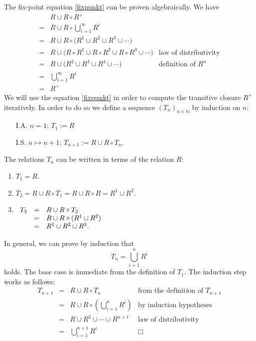 The fix-point equation  \ref{fixpunkt} can be proven algebraically.  We have
\[
\begin{array}{cll}
    & R \cup R \circ R^+ \\[0.2cm]
  = & R \cup R \circ \bigcup\limits_{i=1}^{\infty} R^i \\[0.4cm]
  = & R \cup R \circ \bigl(R^1 \cup R^2 \cup R^3 \cup \cdots \bigr) \\[0.2cm]
  = & R \cup \bigl(R \circ R^1 \cup R \circ R^2 \cup R \circ R^3 \cup \cdots \bigr) &
      \mbox{law of distributivity} \\[0.2cm]
  = & R \cup \bigl(R^2 \cup R^3 \cup  R^4 \cup \cdots \bigr) & \mbox{definition of $R^n$} \\[0.2cm]
  = & \bigcup\limits_{i=1}^{\infty} R^i \\[0.4cm]
  = & R^+
\end{array}
\]
We will use the equation \ref{fixpunkt} in order to compute the transitive closure $R^+$
iteratively.  In order to do so we define a sequence  $(T_n)_{n \in \mathbb{N}}$ by
induction on $n$:
\begin{enumerate}
\item[I.A.] $n = 1$: \hspace*{2.3cm} $T_1 := R$
\item[I.S.] $n \mapsto n+1$: \hspace*{1.6cm} $T_{n+1} := R \cup R \circ T_n$. 
\end{enumerate}
The relations $T_n$ can be written in terms of the relation $R$:
\begin{enumerate}
\item $T_1 = R$.
\item $T_2 = R \cup R \circ T_1 = R \cup R \circ R = R^1 \cup R^2$.
\item $\begin{array}[t]{lcl}
       T_3  & = & R \cup R \circ T_2 \\
            & = & R \cup R \circ (R^1 \cup R^2) \\
            & = & R^1 \cup R^2 \cup R^3. \\
       \end{array}
      $
\end{enumerate}
In general, we can prove by induction that 
\[ T_n = \bigcup\limits_{i=1}^{n} R^i \]
holds.  
The base case is immediate from the definition of  $T_1$.  The induction step works as follows:
\[ \begin{array}{lcll}
   T_{n+1} & = & R \cup R \circ T_n & \mbox{from the definition of $T_{n+1}$} \\[0.2cm]
           & = & R \cup R \circ \left(\bigcup\limits_{i=1}^{n} R^i\right) &
                 \mbox{by induction hypotheses} \\[0.4cm]
           & = & R \cup R^2 \cup \cdots \cup R^{n+1}  &
                 \mbox{law of distributivity} \\[0.2cm]
           & = & \bigcup\limits_{i=1}^{n+1} R^i & \Box 
   \end{array}
\]
